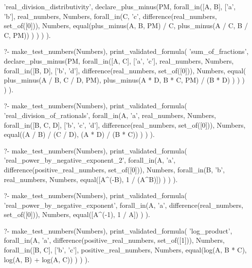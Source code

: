 \begin{fact}
\begin{prolog}
		'real_division_distributivity',
		declare_plus_minus(PM,
			forall_in([A, B], ['a', 'b'], real_numbers, Numbers,
				forall_in(C, 'c', difference(real_numbers, set_of([0])), Numbers,
					equal(plus_minus(A, B, PM) / C, plus_minus(A / C, B / C, PM))
				)
			)
		)
	).
\end{prolog}
\begin{prolog}
?-	make_test_numbers(Numbers),
	print_validated_formula(
		'sum_of_fractions',
		declare_plus_minus(PM,
			forall_in([A, C], ['a', 'c'], real_numbers, Numbers,
				forall_in([B, D], ['b', 'd'], difference(real_numbers, set_of([0])), Numbers,
					equal(
						plus_minus(A / B, C / D, PM),
						plus_minus(A * D, B * C, PM) / (B * D)
					)
				)
			)
		)
	).
\end{prolog}
\begin{prolog}
?-	make_test_numbers(Numbers),
	print_validated_formula(
		'real_division_of_rationals',
		forall_in(A, 'a', real_numbers, Numbers,
			forall_in([B, C, D], ['b', 'c', 'd'], difference(real_numbers, set_of([0])), Numbers,
				equal((A / B) / (C / D), (A * D) / (B * C))
			)
		)
	).
\end{prolog}
\begin{prolog}
?-	make_test_numbers(Numbers),
	print_validated_formula(
		'real_power_by_negative_exponent_2',
		forall_in(A, 'a', difference(positive_real_numbers, set_of([0])), Numbers,
			forall_in(B, 'b', real_numbers, Numbers,
				equal([A^(-B), 1 / (A^B)])
			)
		)
	).
\end{prolog}
\begin{prolog}
?-	make_test_numbers(Numbers),
	print_validated_formula(
		'real_power_by_negative_exponent',
		forall_in(A, 'a', difference(real_numbers, set_of([0])), Numbers,
			equal([A^(-1), 1 / A])
		)
	).
\end{prolog}
\begin{prolog}
?-	make_test_numbers(Numbers),
	print_validated_formula(
		'log_product',
		forall_in(A, 'a', difference(positive_real_numbers, set_of([1])), Numbers,
			forall_in([B, C], ['b', 'c'], positive_real_numbers, Numbers,
				equal(log(A, B * C), log(A, B) + log(A, C))
			)
		)
	).				
\end{prolog}

\end{fact}
